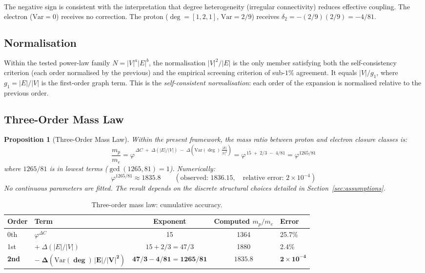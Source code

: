 \documentclass[12pt]{article}
\newtheorem{proposition}[theorem]{Proposition}
\newcommand{\phig}{\varphi}
\begin{document}
The negative sign is consistent with the interpretation that degree heterogeneity (irregular connectivity) reduces effective coupling. The electron ($\mathrm{Var} = 0$) receives no correction. The proton ($\deg = [1,2,1]$, $\mathrm{Var} = 2/9$) receives $\delta_2 = -(2/9)(2/9) = -4/81$.

\subsection{Normalisation}

Within the tested power-law family $N = |V|^a |E|^b$, the normalisation $|V|^2/|E|$ is the only member satisfying both the self-consistency criterion (each order normalised by the previous) and the empirical screening criterion of sub-$1\%$ agreement. It equals $|V|/g_1$, where $g_1 = |E|/|V|$ is the first-order graph term. This is the \textit{self-consistent normalisation}: each order of the expansion is normalised relative to the previous order.

\subsection{Three-Order Mass Law}

\begin{proposition}[Three-Order Mass Law]\label{prop:threeorder}
Within the present framework, the mass ratio between proton and electron closure classes is:
\begin{equation}\label{eq:three_order}
    \frac{m_p}{m_e} = \phig^{\,\Delta C \;+\; \Delta(|E|/|V|) \;-\; \Delta\!\left(\mathrm{Var}(\deg)\,\frac{|E|}{|V|^2}\right)} = \phig^{\,15 \;+\; 2/3 \;-\; 4/81} = \phig^{1265/81}
\end{equation}
where $1265/81$ is in lowest terms ($\gcd(1265,81) = 1$). Numerically:
\[
\phig^{1265/81} \approx 1835.8 \qquad (\text{observed: } 1836.15, \quad \text{relative error: } 2 \times 10^{-4})
\]
No continuous parameters are fitted. The result depends on the discrete structural choices detailed in Section~\ref{sec:assumptions}.
\end{proposition}

\begin{table}[ht]
\centering
\caption{Three-order mass law: cumulative accuracy.}
\label{tab:results}
\begin{tabular}{@{}llccl@{}}
\toprule
Order & Term & Exponent & Computed $m_p/m_e$ & Error \\
\midrule
0th & $\phig^{\Delta C}$ & 15 & 1364 & 25.7\% \\
1st & $+\;\Delta(|E|/|V|)$ & $15 + 2/3 = 47/3$ & 1880 & 2.4\% \\
\textbf{2nd} & $\boldsymbol{-\;\Delta(\mathrm{Var}(\deg)\,|E|/|V|^2)}$ & $\boldsymbol{47/3 - 4/81 = 1265/81}$ & $\boldsymbol{1835.8}$ & $\boldsymbol{2 \times 10^{-4}}$ \\
\bottomrule
\end{tabular}
\end{table}
\end{document}
